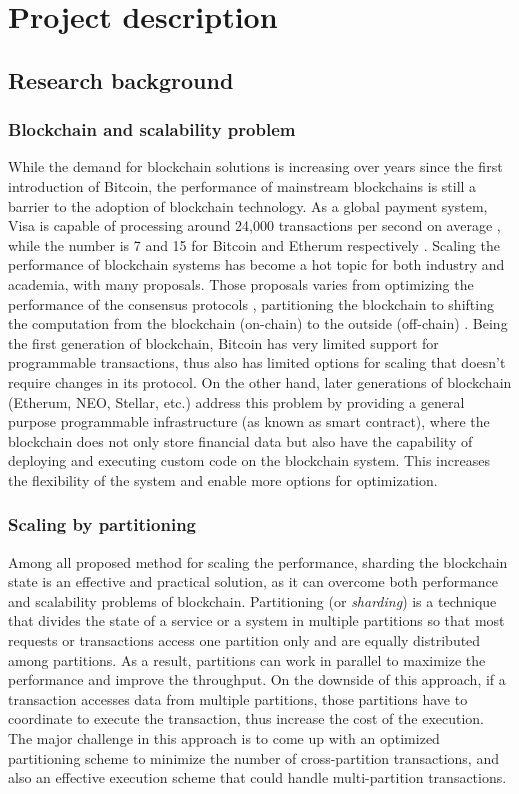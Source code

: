 \newpage
\section{Project description}

\subsection{Research background}

\subsubsection{Blockchain and scalability problem}
While the demand for blockchain solutions is increasing over years since the
first introduction of Bitcoin, the performance of mainstream blockchains is
still a barrier to the adoption of blockchain technology. As a global payment
system, Visa is capable of processing around 24,000 transactions per second on
average \cite{visa}, while the number is 7 and 15 for Bitcoin and Etherum
respectively \cite{ethereum:sharding, nakamoto2019bitcoin}. Scaling the
performance of blockchain systems has become a hot topic for both industry and
academia, with many proposals. Those proposals varies from optimizing the
performance of the consensus protocols \cite{dang2019towards}, partitioning the
blockchain \cite{wang2019sok} to shifting the computation from the blockchain
(on-chain) to the outside (off-chain) \cite{teutsch2019scalable,
network2018cheap}. Being the first generation of blockchain, Bitcoin has very
limited support for programmable transactions, thus also has limited options for
scaling that doesn't require changes in its protocol. On the other hand, later
generations of blockchain (Etherum, NEO, Stellar, etc.) address this problem by
providing a general purpose programmable infrastructure (as known as smart
contract), where the blockchain does not only store financial data but also have
the capability of deploying and executing custom code on the blockchain system.
This increases the flexibility of the system and enable more options for
optimization.

\subsubsection{Scaling by partitioning}
Among all proposed method for scaling the performance, sharding the blockchain
state is an effective and practical solution, as it can overcome both
performance and scalability problems of blockchain. Partitioning (or
\emph{sharding}) is a technique that divides the state of a service or a system
in multiple partitions so that most requests or transactions access one
partition only and are equally distributed among partitions. As a result,
partitions can work in parallel to maximize the performance and improve the
throughput. On the downside of this approach, if a transaction accesses data
from multiple partitions, those partitions have to coordinate to execute the
transaction, thus increase the cost of the execution. The major challenge in
this approach is to come up with an optimized partitioning scheme to minimize
the number of cross-partition transactions, and also an effective execution
scheme that could handle multi-partition transactions.

